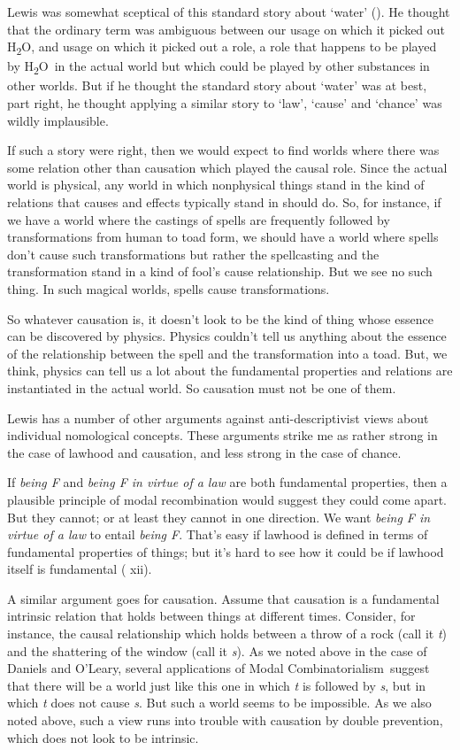 \documentclass[
  10pt,
  letterpaper,
  DIV=11,
  numbers=noendperiod,
  twoside]{scrartcl}
\begin{document}
Lewis was somewhat sceptical of this standard story about `water'
(). He thought that the ordinary
term was ambiguous between our usage on which it picked out
H\textsubscript{2}O, and usage on which it picked out a role, a role
that happens to be played by H\textsubscript{2}O~in the actual world but
which could be played by other substances in other worlds. But if he
thought the standard story about `water' was at best, part right, he
thought applying a similar story to `law', `cause' and `chance' was
wildly implausible.

If such a story were right, then we would expect to find worlds where
there was some relation other than causation which played the causal
role. Since the actual world is physical, any world in which nonphysical
things stand in the kind of relations that causes and effects typically
stand in should do. So, for instance, if we have a world where the
castings of spells are frequently followed by transformations from human
to toad form, we should have a world where spells don't cause such
transformations but rather the spellcasting and the transformation stand
in a kind of fool's cause relationship. But we see no such thing. In
such magical worlds, spells cause transformations.

So whatever causation is, it doesn't look to be the kind of thing whose
essence can be discovered by physics. Physics couldn't tell us anything
about the essence of the relationship between the spell and the
transformation into a toad. But, we think, physics can tell us a lot
about the fundamental properties and relations are instantiated in the
actual world. So causation must not be one of them.

Lewis has a number of other arguments against anti-descriptivist views
about individual nomological concepts. These arguments strike me as
rather strong in the case of lawhood and causation, and less strong in
the case of chance.

If \emph{being F} and \emph{being F in virtue of a law} are both
fundamental properties, then a plausible principle of modal
recombination would suggest they could come apart. But they cannot; or
at least they cannot in one direction. We want \emph{being F in virtue
of a law} to entail \emph{being F}. That's easy if lawhood is defined in
terms of fundamental properties of things; but it's hard to see how it
could be if lawhood itself is fundamental
( xii).

A similar argument goes for causation. Assume that causation is a
fundamental intrinsic relation that holds between things at different
times. Consider, for instance, the causal relationship which holds
between a throw of a rock (call it \emph{t}) and the shattering of the
window (call it \emph{s}). As we noted above in the case of Daniels and
O'Leary, several applications of Modal Combinatorialism~suggest that
there will be a world just like this one in which \emph{t} is followed
by \emph{s}, but in which \emph{t} does not cause \emph{s}. But such a
world seems to be impossible. As we also noted above, such a view runs
into trouble with causation by double prevention, which does not look to
be intrinsic.
\end{document}
